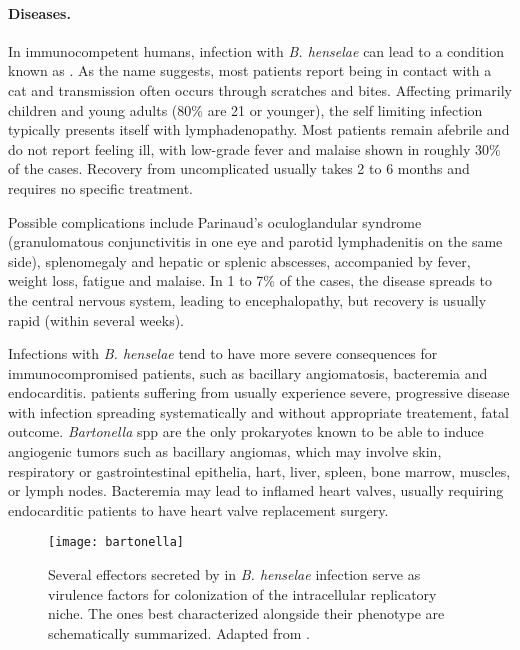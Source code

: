 \paragraph{Diseases.}
In immunocompetent humans, infection with \textit{B. henselae} can lead to a condition known as . As the name suggests, most patients report being in contact with a cat and transmission often occurs through scratches and bites. Affecting primarily children and young adults (80\% are 21 or younger), the self limiting infection typically presents itself with lymphadenopathy. Most patients remain afebrile and do not report feeling ill, with low-grade fever and malaise shown in roughly 30\% of the cases. Recovery from uncomplicated  usually takes 2 to 6 months and requires no specific treatment.

Possible complications include Parinaud's oculoglandular syndrome (granulomatous conjunctivitis in one eye and parotid lymphadenitis on the same side), splenomegaly and hepatic or splenic abscesses, accompanied by fever, weight loss, fatigue and malaise. In 1 to 7\% of the cases, the disease spreads to the central nervous system, leading to encephalopathy, but recovery is usually rapid (within several weeks).

Infections with \textit{B. henselae} tend to have more severe consequences for immunocompromised patients, such as bacillary angiomatosis, bacteremia and endocarditis.  patients suffering from  usually experience severe, progressive disease with infection spreading systematically and without appropriate treatement, fatal outcome. \textit{Bartonella} \acrshort{spp} are the only prokaryotes known to be able to induce angiogenic tumors such as bacillary angiomas, which may involve skin, respiratory or gastrointestinal epithelia, hart, liver, spleen, bone marrow, muscles, or lymph nodes. Bacteremia may lead to inflamed heart valves, usually requiring endocarditic patients to have heart valve replacement surgery.

\begin{figure}
  \centering
  \texttt{[image: bartonella]}
  \caption[Bacterial effectors of \textit{B. henselae}, secreted by  into the host cytosol.]{Several effectors secreted by  in \textit{B. henselae} infection serve as virulence factors for colonization of the intracellular replicatory niche. The ones best characterized alongside their phenotype are schematically summarized. Adapted from \citet{Harms2012}.}
  \label{fig:bartonella}
\end{figure}

